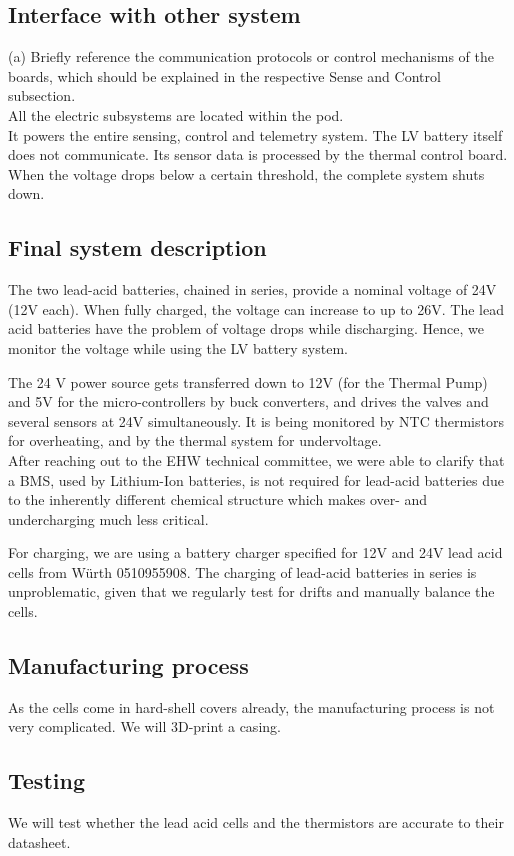 \subsection{Interface with other system}
(a) Briefly reference the communication protocols or control mechanisms of the boards, which should be explained in the respective Sense and Control subsection. \\
All the electric subsystems are located within the pod. \\
It powers the entire sensing, control and telemetry system. 
The LV battery itself does not communicate. Its sensor data is processed by the thermal control board.
When the voltage drops below a certain threshold, the complete system shuts down.

\subsection{Final system description}
The two lead-acid batteries, chained in series, provide a nominal voltage of 24V (12V each). When fully charged, the voltage can increase to up to 26V. The lead acid batteries have the problem of voltage drops while discharging. Hence, we monitor the voltage while using the LV battery system.

The 24 V power source gets transferred down to 12V (for the Thermal Pump) and 5V for the micro-controllers by buck converters, and drives the valves and several sensors at 24V simultaneously. It is being monitored by NTC thermistors for overheating, and by the thermal system for undervoltage. \\
After reaching out to the EHW technical committee, we were able to clarify that a BMS, used by Lithium-Ion batteries, is not required for lead-acid batteries due to the inherently different chemical structure which makes over- and undercharging much less critical.

For charging, we are using a battery charger specified for 12V and 24V lead acid cells from Würth  0510955908. The charging of lead-acid batteries in series is unproblematic, given that we regularly test for drifts and manually balance the cells.

\subsection{Manufacturing process}
As the cells come in hard-shell covers already, the manufacturing process is not very complicated. We will 3D-print a casing.

\subsection{Testing}
We will test whether the lead acid cells and the thermistors are accurate to their datasheet.
